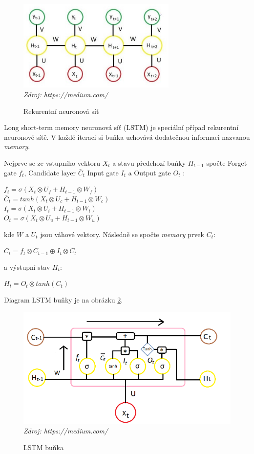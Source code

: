 \begin{figure}[H]
\caption{Rekurentní neuronová síť}
\label{fig:rnn}
\centering
\includegraphics[width=0.7\textwidth]{img/cho/rnn.jpeg}\\
\textit{Zdroj: https://medium.com/}
\end{figure}

Long short-term memory neuronová síť (LSTM) je speciální případ rekurentní neuronové sítě. V každé iteraci si buňka uchovává dodatečnou informaci nazvanou \textit{memory}. 

Nejprve se ze vstupního vektoru $X_{t}$ a stavu předchozí buňky $H_{t-1}$ spočte Forget gate $f_{t}$, Candidate layer $\bar{C}_{t}$ Input gate $I_{t}$ a Output gate $O_{t}$ \citep{cho.lstm}:

$f_{t}=\sigma(X_{t} \otimes U_{f}+H_{t-1} \otimes W_{f})$\\\indent
$\bar{C}_{t}=tanh(X_{t} \otimes U_{c}+H_{t-1} \otimes W_{c})$\\\indent
$I_{t}=\sigma(X_{t} \otimes U_{i}+H_{t-1} \otimes W_{i})$\\\indent
$O_{t}=\sigma(X_{t} \otimes U_{u}+H_{t-1} \otimes W_{u})$

\noindent kde $W$ a $U_{t}$ jsou váhové vektory. Následně se spočte \textit{memory} prvek $C_{t}$:

$C_{t}=f_{t} \otimes C_{t-1} \oplus I_{t} \otimes \bar{C}_{t}$

\noindent a výstupní stav $H_{t}$:

$H_{t}=O_{t} \otimes tanh(C_{t})$

Diagram LSTM buňky je na obrázku \ref{fig:lstm_cell}.

\begin{figure}[H]
\caption{LSTM buňka}
\label{fig:lstm_cell}
\centering
\includegraphics[width=1\textwidth]{img/cho/lstm_cell.png}
\textit{Zdroj: https://medium.com/}
\end{figure}


